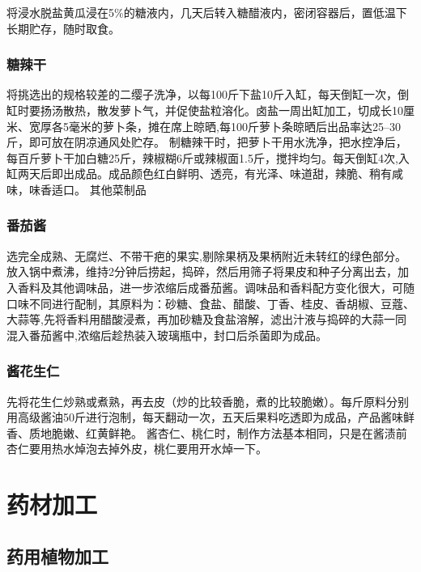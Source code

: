 \documentclass{ctexbook}
\begin{document}
将浸水脱盐黄瓜浸在5\%的糖液内，几天后转入糖醋液内，密闭容器后，置低温下长期贮存，随时取食。
\subsection{糖辣干}
将挑选出的规格较差的二缨子洗净，以每100斤下盐10斤入缸，每天倒缸一次，倒缸时要扬汤散热，散发萝卜气，并促使盐粒溶化。卤盐一周出缸加工，切成长10厘米、宽厚各5毫米的萝卜条，摊在席上晾晒,每100斤萝卜条晾晒后出品率达25--30斤，即可放在阴凉通风处贮存。
制糖辣干时，把萝卜干用水洗净，把水控净后，每百斤萝卜干加白糖25斤，辣椒糊6斤或辣椒面1.5斤，搅拌均匀。每天倒缸4次,入缸两天后即出成品。成品颜色红白鲜明、透亮，有光泽、味道甜，辣脆、稍有咸味，味香适口。
其他菜制品
\subsection{番茄酱}
选完全成熟、无腐烂、不带干疤的果实,剔除果柄及果柄附近未转红的绿色部分。放入锅中煮沸，维持2分钟后捞起，捣碎，然后用筛子将果皮和种子分离出去，加入香料及其他调味品，进一步浓缩后成番茄酱。调味品和香料配方变化很大，可随口味不同进行配制，其原料为：砂糖、食盐、醋酸、丁香、桂皮、香胡椒、豆蔻、大蒜等,先将香料用醋酸浸煮，再加砂糖及食盐溶解，滤出汁液与捣碎的大蒜一同混入番茄酱中,浓缩后趁热装入玻璃瓶中，封口后杀菌即为成品。
\subsection{酱花生仁}
先将花生仁炒熟或煮熟，再去皮（炒的比较香脆，煮的比较脆嫩）。每斤原料分别用高级酱油50斤进行泡制，每天翻动一次，五天后果料吃透即为成品，产品酱味鲜香、质地脆嫩、红黄鲜艳。
酱杏仁、桃仁时，制作方法基本相同，只是在酱渍前杏仁要用热水焯泡去掉外皮，桃仁要用开水焯一下。


\chapter{药材加工}
\section{药用植物加工}
\end{document}

